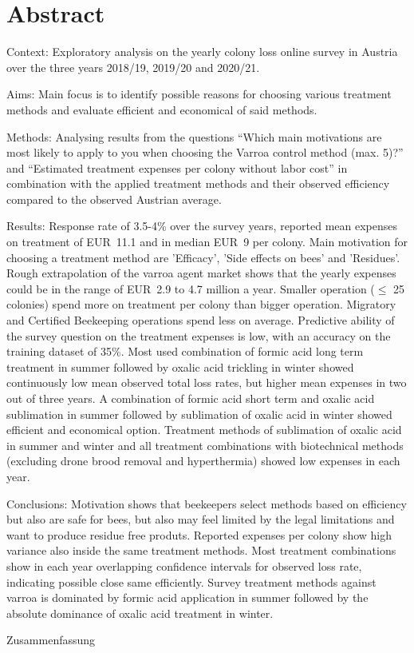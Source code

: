 \chapter*{Abstract}
\label{sec:abstract}
\vspace*{-10mm}

Context:
Exploratory analysis on the yearly colony loss online survey in Austria over the three years 2018/19, 2019/20 and 2020/21.

Aims:
Main focus is to identify possible reasons for choosing various treatment methods and evaluate efficient and economical of said methods.

Methods:
Analysing results from the questions \enquote{Which main motivations are most likely to apply to you when choosing the Varroa control method (max. 5)?} and \enquote{Estimated treatment expenses per colony without labor cost} in combination with the applied treatment methods and their observed efficiency compared to the observed Austrian average.

Results:
Response rate of 3.5-4\% over the survey years, reported mean expenses on treatment of EUR~11.1 and in median EUR~9 per colony. Main motivation for choosing a treatment method are 'Efficacy', 'Side effects on bees' and 'Residues'. Rough extrapolation of the varroa agent market shows that the yearly expenses could be in the range of EUR~2.9 to 4.7 million a year. Smaller operation ($\leq$ 25 colonies) spend more on treatment per colony than bigger operation. Migratory and Certified Beekeeping operations spend less on average. Predictive ability of the survey question on the treatment expenses is low, with an accuracy on the training dataset of 35\%. Most used combination of formic acid long term treatment in summer followed by oxalic acid trickling in winter showed continuously low mean observed total loss rates, but higher mean expenses in two out of three years. A combination of formic acid short term and oxalic acid sublimation in summer followed by sublimation of oxalic acid in winter showed efficient and economical option. Treatment methods of sublimation of oxalic acid in summer and winter and all treatment combinations with biotechnical methods (excluding drone brood removal and hyperthermia) showed low expenses in each year.

Conclusions:
Motivation shows that beekeepers select methods based on efficiency but also are safe for bees, but also may feel limited by the legal limitations and want to produce residue free produts. Reported expenses per colony show high variance also inside the same treatment methods. Most treatment combinations show in each year overlapping confidence intervals for observed loss rate, indicating possible close same efficiently. Survey treatment methods against varroa is dominated by formic acid application in summer followed by the absolute dominance of oxalic acid treatment in winter.

\vspace*{20mm}

{Zusammenfassung}
\label{sec:Zusammenfassung}

\blindtext